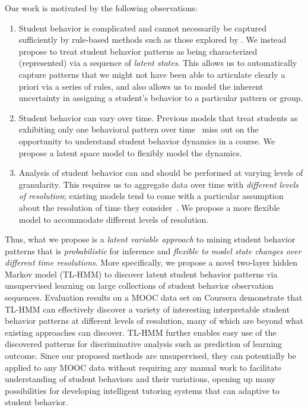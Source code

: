 Our work is motivated by the following observations:
\begin{enumerate}
  \item Student behavior is complicated and cannot necessarily be captured
      sufficiently by rule-based methods such as those explored by
      \citet{Kizilcec:2013:LAK}. We instead propose to treat
      student behavior patterns as being characterized (represented) via a sequence of
      \emph{latent states}. This allows us to automatically capture
      patterns that we might not have been able to articulate clearly a
      priori via a series of rules, and also allows us to model the
      inherent uncertainty in assigning a student's behavior to a
      particular pattern or group. 
  \item Student behavior can vary over time. Previous models that treat students
      as exhibiting only one behavioral pattern over
      time~\cite{Faucon:2016:EDM} miss out on the opportunity to understand
      student behavior dynamics in a course. We propose a latent space model to flexibly model the dynamics. 
  \item Analysis of student behavior can and should be performed at varying
      levels of granularity. This requires us to aggregate data over time
      with \emph{different levels of resolution}; existing models tend to come
      with a particular assumption about the resolution of time they
      consider~\cite{Faucon:2016:EDM, Kizilcec:2013:LAK, Shih:2010:EDM}. We propose a more flexible model to accommodate different levels of resolution. 
\end{enumerate}

Thus, what we propose is a \emph{latent variable approach} to mining student behavior
patterns that is \emph{probabilistic} for inference and 
\emph{flexible to model state changes over different time resolutions}. 
More specifically, we propose a novel two-layer hidden Markov model (TL-HMM) to
 discover latent student behavior patterns via
unsupervised learning on large collections of student behavior observation
sequences. Evaluation results on a MOOC data set on Coursera demonstrate that TL-HMM can effectively 
discover a variety of interesting interpretable student behavior patterns at different levels of resolution, many of which are beyond what existing approaches can discover. TL-HMM further enables easy use of the discovered patterns for discriminative analysis such as prediction of learning outcome. 
Since our proposed methods are unsupervised, they can potentially be applied to any MOOC data without requiring any manual work to facilitate understanding of student behaviors and their variations, opening up many possibilities for developing intelligent tutoring systems that can adaptive to student behavior. 


